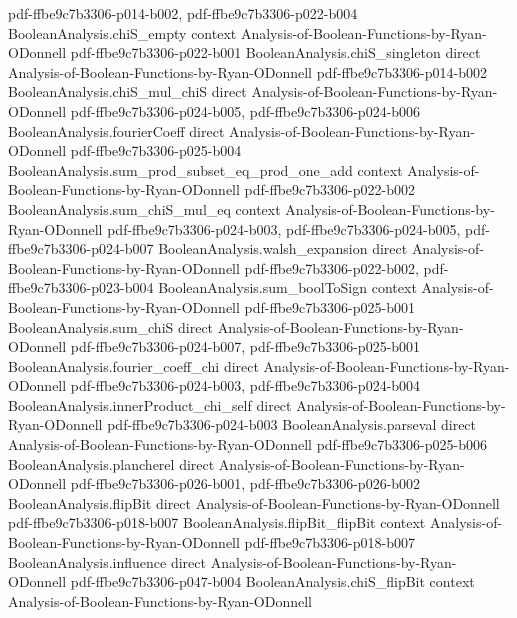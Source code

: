 \begin{theorem}
  {pdf-ffbe9c7b3306-p014-b002,
    pdf-ffbe9c7b3306-p022-b004}
\proofstep
  {BooleanAnalysis.chiS_empty}
  {context}
  {Analysis-of-Boolean-Functions-by-Ryan-ODonnell}
  {pdf-ffbe9c7b3306-p022-b001}
\proofstep
  {BooleanAnalysis.chiS_singleton}
  {direct}
  {Analysis-of-Boolean-Functions-by-Ryan-ODonnell}
  {pdf-ffbe9c7b3306-p014-b002}
\proofstep
  {BooleanAnalysis.chiS_mul_chiS}
  {direct}
  {Analysis-of-Boolean-Functions-by-Ryan-ODonnell}
  {pdf-ffbe9c7b3306-p024-b005,
    pdf-ffbe9c7b3306-p024-b006}
\proofstep
  {BooleanAnalysis.fourierCoeff}
  {direct}
  {Analysis-of-Boolean-Functions-by-Ryan-ODonnell}
  {pdf-ffbe9c7b3306-p025-b004}
\proofstep
  {BooleanAnalysis.sum_prod_subset_eq_prod_one_add}
  {context}
  {Analysis-of-Boolean-Functions-by-Ryan-ODonnell}
  {pdf-ffbe9c7b3306-p022-b002}
\proofstep
  {BooleanAnalysis.sum_chiS_mul_eq}
  {context}
  {Analysis-of-Boolean-Functions-by-Ryan-ODonnell}
  {pdf-ffbe9c7b3306-p024-b003,
    pdf-ffbe9c7b3306-p024-b005,
    pdf-ffbe9c7b3306-p024-b007}
\proofstep
  {BooleanAnalysis.walsh_expansion}
  {direct}
  {Analysis-of-Boolean-Functions-by-Ryan-ODonnell}
  {pdf-ffbe9c7b3306-p022-b002,
    pdf-ffbe9c7b3306-p023-b004}
\proofstep
  {BooleanAnalysis.sum_boolToSign}
  {context}
  {Analysis-of-Boolean-Functions-by-Ryan-ODonnell}
  {pdf-ffbe9c7b3306-p025-b001}
\proofstep
  {BooleanAnalysis.sum_chiS}
  {direct}
  {Analysis-of-Boolean-Functions-by-Ryan-ODonnell}
  {pdf-ffbe9c7b3306-p024-b007,
    pdf-ffbe9c7b3306-p025-b001}
\proofstep
  {BooleanAnalysis.fourier_coeff_chi}
  {direct}
  {Analysis-of-Boolean-Functions-by-Ryan-ODonnell}
  {pdf-ffbe9c7b3306-p024-b003,
    pdf-ffbe9c7b3306-p024-b004}
\proofstep
  {BooleanAnalysis.innerProduct_chi_self}
  {direct}
  {Analysis-of-Boolean-Functions-by-Ryan-ODonnell}
  {pdf-ffbe9c7b3306-p024-b003}
\proofstep
  {BooleanAnalysis.parseval}
  {direct}
  {Analysis-of-Boolean-Functions-by-Ryan-ODonnell}
  {pdf-ffbe9c7b3306-p025-b006}
\proofstep
  {BooleanAnalysis.plancherel}
  {direct}
  {Analysis-of-Boolean-Functions-by-Ryan-ODonnell}
  {pdf-ffbe9c7b3306-p026-b001,
    pdf-ffbe9c7b3306-p026-b002}
\proofstep
  {BooleanAnalysis.flipBit}
  {direct}
  {Analysis-of-Boolean-Functions-by-Ryan-ODonnell}
  {pdf-ffbe9c7b3306-p018-b007}
\proofstep
  {BooleanAnalysis.flipBit_flipBit}
  {context}
  {Analysis-of-Boolean-Functions-by-Ryan-ODonnell}
  {pdf-ffbe9c7b3306-p018-b007}
\proofstep
  {BooleanAnalysis.influence}
  {direct}
  {Analysis-of-Boolean-Functions-by-Ryan-ODonnell}
  {pdf-ffbe9c7b3306-p047-b004}
\proofstep
  {BooleanAnalysis.chiS_flipBit}
  {context}
  {Analysis-of-Boolean-Functions-by-Ryan-ODonnell}

\end{theorem}
